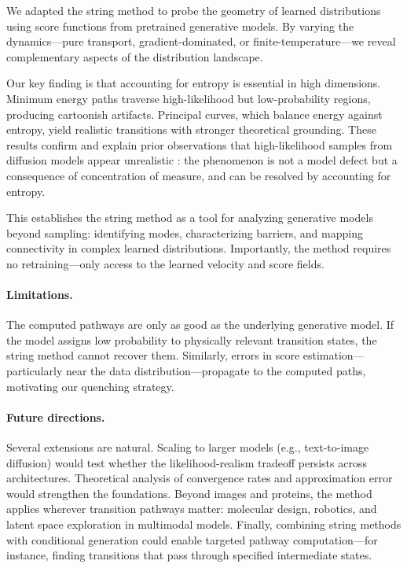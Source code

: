 \documentclass{article}
\theoremstyle{plain}
\theoremstyle{definition}
\theoremstyle{remark}
\begin{document}
We adapted the string method to probe the geometry of learned distributions using score functions from pretrained generative models. By varying the dynamics---pure transport, gradient-dominated, or finite-temperature---we reveal complementary aspects of the distribution landscape.

Our key finding is that accounting for entropy is essential in high dimensions. Minimum energy paths traverse high-likelihood but low-probability regions, producing cartoonish artifacts. Principal curves, which balance energy against entropy, yield realistic transitions with stronger theoretical grounding. These results confirm and explain prior observations that high-likelihood samples from diffusion models appear unrealistic \citep{guth2025learning, karczewski2025diffusion}: the phenomenon is not a model defect but a consequence of concentration of measure, and can be resolved by accounting for entropy.

This establishes the string method as a tool for analyzing generative models beyond sampling: identifying modes, characterizing barriers, and mapping connectivity in complex learned distributions. Importantly, the method requires no retraining---only access to the learned velocity and score fields.

\paragraph{Limitations.} The computed pathways are only as good as the underlying generative model. If the model assigns low probability to physically relevant transition states, the string method cannot recover them. Similarly, errors in score estimation---particularly near the data distribution---propagate to the computed paths, motivating our quenching strategy.

\paragraph{Future directions.} Several extensions are natural. Scaling to larger models (e.g., text-to-image diffusion) would test whether the likelihood-realism tradeoff persists across architectures. Theoretical analysis of convergence rates and approximation error would strengthen the foundations. Beyond images and proteins, the method applies wherever transition pathways matter: molecular design, robotics, and latent space exploration in multimodal models. Finally, combining string methods with conditional generation could enable targeted pathway computation---for instance, finding transitions that pass through specified intermediate states.
\end{document}
